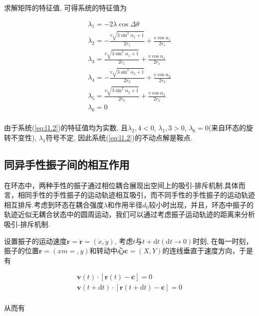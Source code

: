 \documentclass{article}
\begin{document}
求解矩阵的特征值, 可得系统的特征值为

$$
\begin{array}{l}
	\lambda _1=-2\lambda \cos \Delta \theta\\
	\lambda _2=-\frac{v\sqrt{3\sin ^2\alpha _1+1}}{2r_1}+\frac{v\cos \alpha _1}{2r_1}\\
	\lambda _3=\frac{v\sqrt{3\sin ^2\alpha _1+1}}{2r_1}+\frac{v\cos \alpha _1}{2r_1}\\
	\lambda _4=-\frac{v\sqrt{3\sin ^2\alpha _2+1}}{2r_2}+\frac{v\cos \alpha _2}{2r_2}\\
	\lambda _5=\frac{v\sqrt{3\sin ^2\alpha _2+1}}{2r_2}+\frac{v\cos \alpha _2}{2r_2}\\
	\lambda _6=0\\
\end{array}
$$

由于系统(\ref{eq:l1.2})的特征值均为实数, 且$\lambda _2,4<0$, $\lambda _1,3>0$, $\lambda _6=0$(来自环态的旋转不变性), $\lambda _1$符号不定, 因此系统(\ref{eq:l1.2})的不动点解是鞍点. 

\newpage
\subsection{同异手性振子间的相互作用}

在环态中，两种手性的振子通过相位耦合展现出空间上的吸引-排斥机制.具体而言，相同手性的手性振子的运动轨迹相互吸引，而不同手性的手性振子的运动轨迹相互排斥.考虑到环态在耦合强度$\lambda$和作用半径$d_0$较小时出现，并且，环态中振子的轨迹近似无耦合状态中的圆周运动，我们可以通过考虑振子运动轨迹的距离来分析吸引-排斥机制.

设置振子的运动速度$\mathbf{r}=\dot{\mathbf{r}}=\left( \dot{x}, \dot{y} \right)$, 考虑$t$与$t+\mathrm{d}t(\mathrm{d}t\rightarrow0)$时刻, 在每一时刻，振子的位置$\mathbf{r}=(xm=, y)$和转动中心$\mathbf{c}=(X, Y)$的连线垂直于速度方向，于是有

$$
\begin{array}{l}
	\mathbf{v}\left( t \right) \cdot \left[ \mathbf{r}\left( t \right) -\mathbf{c} \right] =0\\
	\mathbf{v}\left( t+\mathrm{d}t \right) \cdot \left[ \mathbf{r}\left( t+\mathrm{d}t \right) -\mathbf{c} \right] =0\\
\end{array}
$$

从而有
\end{document}
